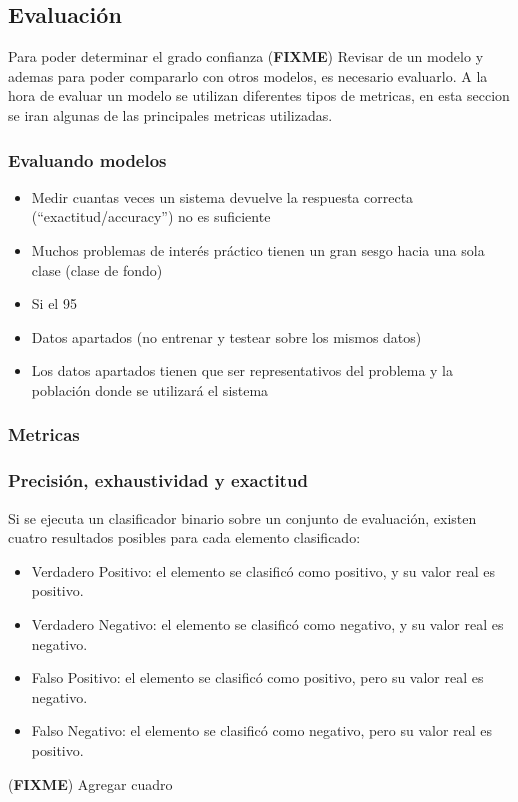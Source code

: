 \documentclass[a4paper,11pt,spanish]{book}
\newcommand*{\FIXME}[1]{{(\textbf{FIXME}) {#1}}}
\begin{document}
      \subsection{Evaluación}
	Para poder determinar el grado confianza \FIXME{Revisar} de un modelo y ademas para poder compararlo con otros modelos, es necesario evaluarlo. 
	A la hora de evaluar un modelo se utilizan diferentes tipos de metricas, en esta seccion se iran algunas de las principales metricas utilizadas.    
	\subsubsection {Evaluando modelos}
	  \begin{itemize}
	    \item Medir cuantas veces un sistema devuelve la respuesta correcta (“exactitud/accuracy”) no es suficiente
	    \item Muchos problemas de interés práctico tienen un gran sesgo hacia una sola clase (clase de fondo)
	    \item Si el 95%
	    \item Datos apartados (no entrenar y testear sobre los mismos datos)
	    \item Los datos apartados tienen que ser representativos del problema y la población donde se utilizará el sistema
	  \end{itemize}
	\subsubsection {Metricas}
	\subsubsection {Precisión, exhaustividad y exactitud}
	  Si se ejecuta un clasificador binario sobre un conjunto de evaluación, existen cuatro resultados posibles para cada elemento clasificado:
	  \begin{itemize}	
	    \item Verdadero Positivo: el elemento se clasificó como positivo, y su valor real es positivo.
	    \item Verdadero Negativo: el elemento se clasificó como negativo, y su valor real es negativo.
	    \item Falso Positivo: el elemento se clasificó como positivo, pero su valor real es negativo.
	    \item Falso Negativo: el elemento se clasificó como negativo, pero su valor real es positivo.
	  \end{itemize}
	  \FIXME{Agregar cuadro}
	  
\end{document}
